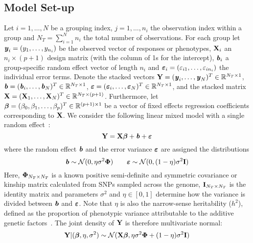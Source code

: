 \subsection{Model Set-up}

Let $i = 1, \ldots, N$ be a grouping index, $j = 1, \ldots, n_i$ the observation index within a group and $N_T = \sum_{i=1}^{N} n_i$ the total number of observations. For each group let \mbox{$\textbf{\emph{y}}_i = (y_1, \ldots, y_{n_i})$} be the observed vector of responses or phenotypes, $\textbf{X}_i$ an $n_i \times (p + 1)$ design matrix (with the column of 1s for the intercept), $\textbf{\emph{b}}_i$ a group-specific random effect vector of length $n_i$ and \mbox{$\boldsymbol{\varepsilon}_i = (\varepsilon_{i1}, \ldots, \varepsilon_{in_i})$} the individual error terms. Denote the stacked vectors $\textbf{Y} = (\textbf{\emph{y}}_i, \ldots, \textbf{\emph{y}}_N)^T \in \mathbb{R}^{N_T \times 1}$, $\textbf{\emph{b}} = (\textbf{\emph{b}}_i, \ldots, \textbf{\emph{b}}_N)^T \in \mathbb{R}^{N_T \times 1}$, \mbox{$\boldsymbol{\varepsilon} = (\boldsymbol{\varepsilon}_i, \ldots, \boldsymbol{\varepsilon}_N)^T \in \mathbb{R}^{N_T \times 1}$}, and the stacked matrix \\\mbox{$\textbf{X} = (\textbf{X}_1, \ldots, \textbf{X}_N)^T \in \mathbb{R}^{N_T \times (p + 1)}$}. Furthermore, let $\boldsymbol{\beta} = (\beta_0,\beta_1, \ldots, \beta_p)^T \in \mathbb{R}^{(p+1) \times 1}$ be a vector of fixed effects regression coefficients corresponding to $\textbf{X}$. We consider the following linear mixed model with a single random effect~\citep{pirinen2013efficient}:
\begin{equation}
\textbf{Y} = \textbf{X} \boldsymbol{\beta} + \textbf{\emph{b}} + \boldsymbol{\varepsilon}
\end{equation}
where the random effect $\textbf{\emph{b}}$ and the error variance $\boldsymbol{\varepsilon}$ are assigned the distributions
\begin{equation}
\textbf{\emph{b}} \sim \mathcal{N}(0, \eta \sigma^2 \boldsymbol{\Phi}) \qquad \boldsymbol{\varepsilon} \sim \mathcal{N}(0, (1-\eta)\sigma^2 \textbf{I})
\end{equation}
Here, $\boldsymbol{\Phi}_{N_T \times N_T}$ is a known positive semi-definite and symmetric covariance or kinship matrix calculated from SNPs sampled across the genome,   $\textbf{I}_{N_T \times N_T}$ is the identity matrix and parameters $\sigma^2$ and $\eta \in [0,1]$ determine how the variance is divided between $\textbf{\emph{b}}$ and $\boldsymbol{\varepsilon}$. Note that $\eta$ is also the narrow-sense heritability ($h^2$), defined as the proportion of phenotypic variance attributable to the additive genetic factors~\citep{manolio2009finding}. The joint density of $\textbf{Y}$ is therefore multivariate normal:
\begin{equation}
\textbf{Y} | (\boldsymbol{\beta}, \eta, \sigma^2) \sim \mathcal{N}(\textbf{X} \boldsymbol{\beta}, \eta \sigma^2 \boldsymbol{\Phi} + (1-\eta)\sigma^2 \textbf{I}) \label{eq:prinen}
\end{equation}

